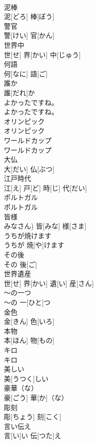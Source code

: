 \documentclass[8pt]{extreport}
\begin{document}
\begin{CJK}{UTF8}{min}
\\	泥棒	
\\	泥[どろ] 棒[ぼう]		
\\	警官	
\\	警[けい] 官[かん]		
\\	世界中	
\\	世[せ] 界[かい] 中[じゅう]		
\\	何語	
\\	何[なに] 語[ご]		
\\	誰か	
\\	誰[だれ]か		
\\	よかったですね。	
\\	よかったですね。		
\\	オリンピック	
\\	オリンピック		
\\	ワールドカップ	
\\	ワールドカップ		
\\	大仏	
\\	大[だい] 仏[ぶつ]		
\\	江戸時代	
\\	江[え] 戸[ど] 時[じ] 代[だい]		
\\	ポルトガル	
\\	ポルトガル		
\\	皆様	
\\	みなさん)	皆[みな] 様[さま]		
\\	うちが焼けます	
\\	うちが 焼[や]けます		
\\	その後	
\\	その 後[ご]		
\\	世界遺産	
\\	世[せ] 界[かい] 遺[い] 産[さん]		
\\	～の一つ	
\\	～の 一[ひと]つ		
\\	金色	
\\	金[きん] 色[いろ]		
\\	本物	
\\	本[ほん] 物[もの]		
\\	キロ	
\\	キロ		
\\	美しい	
\\	美[うつく]しい		
\\	豪華（な）	
\\	豪[ごう] 華[か]（な）		
\\	彫刻	
\\	彫[ちょう] 刻[こく]		
\\	言い伝え	
\\	言[い]い 伝[つた]え		

\end{CJK}
\end{document}
